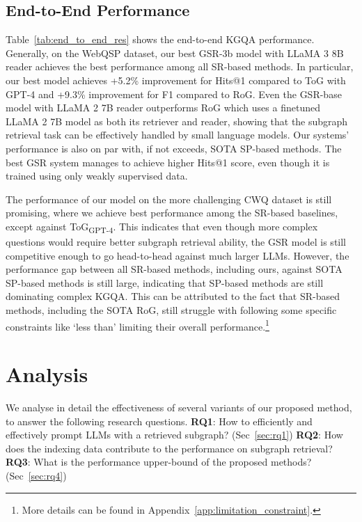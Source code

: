 \documentclass[11pt]{article}
\begin{document}
\subsection{End-to-End Performance} 


Table~\ref{tab:end_to_end_res} shows the end-to-end KGQA performance. Generally, on the WebQSP dataset, our best GSR-3b model with LLaMA 3 8B reader achieves the best performance among all SR-based methods. In particular, our best model achieves +5.2\% improvement for Hits@1 compared to ToG with GPT-4 and +9.3\% improvement for F1 compared to RoG. Even the GSR-base model with LLaMA 2 7B reader outperforms RoG which uses a finetuned LLaMA 2 7B model as both its retriever and reader, showing that the subgraph retrieval task can be effectively handled by small language models. Our systems' performance is also on par with, if not exceeds, SOTA SP-based methods. The best GSR system manages to achieve higher Hits@1 score, even though it is trained using only weakly supervised data. 

The performance of our model on the more challenging CWQ dataset is still promising, where we achieve best performance among the SR-based baselines, except against ToG\textsubscript{GPT-4}. This indicates that even though more complex questions would require better subgraph retrieval ability, the GSR model is still competitive enough to go head-to-head against much larger LLMs. However, the performance gap between all SR-based methods, including ours, against SOTA SP-based methods is still large, indicating that SP-based methods are still dominating complex KGQA. This can be attributed to the fact that SR-based methods, including the SOTA RoG, still struggle with following some specific constraints like `less than' limiting their overall performance.\footnote{More details can be found in Appendix~\ref{app:limitation_constraint}.}


\section{Analysis}
We analyse in detail the effectiveness of several variants of our proposed method, to answer the following research questions. 
\textbf{RQ1}: How to efficiently and effectively prompt LLMs with a retrieved subgraph? (Sec~\ref{sec:rq1})
\textbf{RQ2}: How does the indexing data contribute to the performance on subgraph retrieval?
\textbf{RQ3}: What is the performance upper-bound of the proposed methods? (Sec~\ref{sec:rq4})
\end{document}
